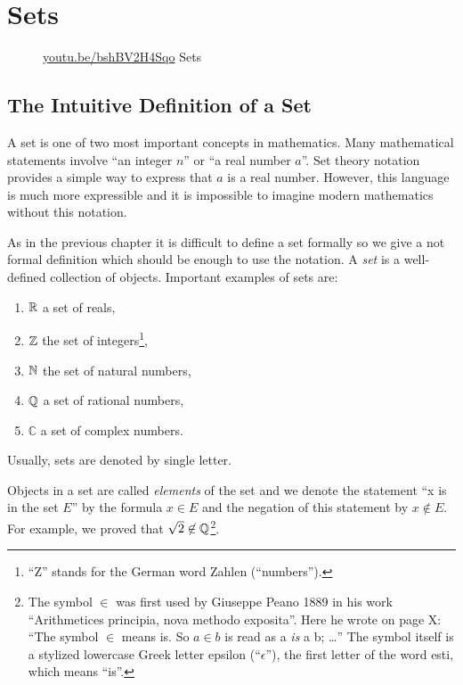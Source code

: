 \chapter{Sets}
\begin{wrapfigure}{l}{4cm}
  \begin{center}
    \vskip -0.5cm
    \vskip 0.25cm
    \href{https://youtu.be/bshBV2H4Sqo}{youtu.be/bshBV2H4Sqo}
    {\footnotesize Sets}
  \end{center}
  \vskip -0.5cm
\end{wrapfigure}
\section{The Intuitive Definition of a Set}
A set is one of two most important concepts in mathematics. Many mathematical
statements involve ``an integer $n$'' or ``a real number $a$''. Set theory
notation provides a simple way to express that $a$ is a real number. However, this language is much more expressible and it is impossible to imagine modern mathematics without this notation.

As in the previous chapter it is difficult to define a set formally so we give a not formal definition which should be enough to use the notation.
A \textit{set} is a well-defined collection of objects. Important examples of
sets are:
\begin{enumerate}
  \item $\mathbb{R}$ a set of reals,
  \item $\mathbb{Z}$ the set of integers\footnote{``Z'' stands for the German word
    Zahlen (``numbers'').},
  \item $\mathbb{N}$ the set of natural numbers,
  \item $\mathbb{Q}$ a set of rational numbers,
  \item $\mathbb{C}$ a set of complex numbers.
\end{enumerate}
Usually, sets are denoted by single letter.

Objects in a set are called \textit{elements} of the set and we denote the
statement ``x is in the set $E$'' by the formula $x \in E$ and the negation of
this statement by $x \not\in E$. For example, we proved that
$\sqrt{2} \not\in \mathbb{Q}$\footnote{%
  The symbol $\in$ was first used by Giuseppe Peano 1889 in his work ``Arithmetices principia, nova methodo exposita''. Here he wrote on page X:
  ``The symbol $\in$ means is. So $a \in b$ is read as a \textit{is} a b;
  \dots''
  The symbol itself is a stylized lowercase Greek letter epsilon
  (``$\epsilon$''), the first letter of the word  \textgreek{esti}, which means ``is''.
}.

